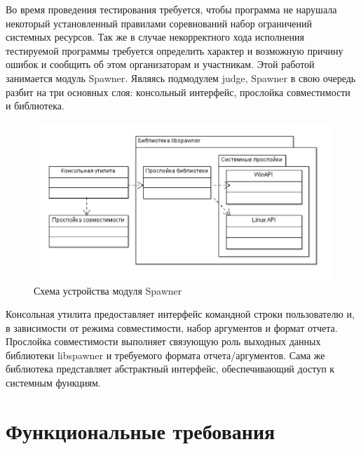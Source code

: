 \documentclass{imcs}
\begin{document}
Во время проведения тестирования требуется, чтобы программа не нарушала некоторый установленный правилами соревнований набор ограничений системных ресурсов. Так же в случае некорректного хода исполнения тестируемой программы требуется определить характер и возможную причину ошибок и сообщить об этом организаторам и участникам. Этой работой занимается модуль Spawner.
Являясь подмодулем judge, Spawner в свою очередь разбит на три основных слоя: консольный интерфейс, прослойка совместимости и библиотека.
\begin{figure}[htb]
\centering
\includegraphics{./img/sp.png}
\caption{Схема устройства модуля Spawner}
\label{spawnermodule}
\end{figure}
Консольная утилита предоставляет интерфейс командной строки пользователю и, в зависимости от режима совместимости, набор аргументов и формат отчета.
Прослойка совместимости выполняет связующую роль выходных данных библиотеки libspawner и требуемого формата отчета/аргументов.
Сама же библиотека представляет абстрактный интерфейс, обеспечивающий доступ к системным функциям.



\pagebreak



\section{Функциональные требования}
\end{document}
